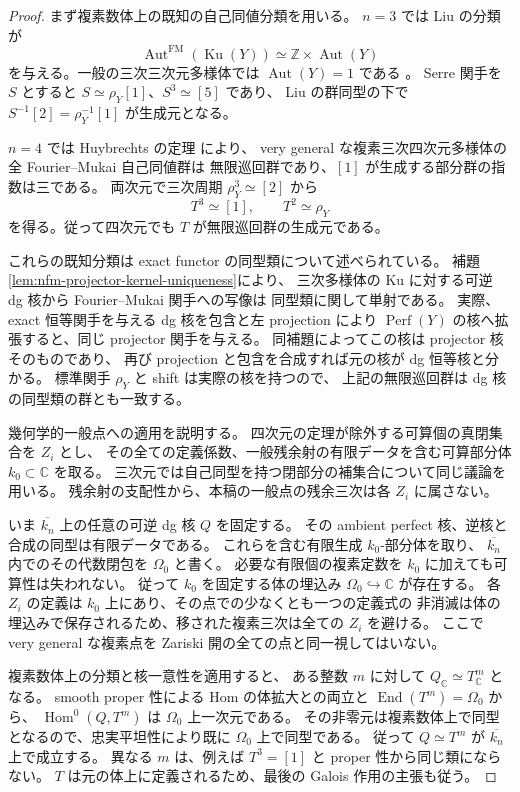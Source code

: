 \begin{proof}
まず複素数体上の既知の自己同値分類を用いる。
$n=3$ では Liu の分類
\cite[Theorem~4.13]{NFMLiuCubicThreefoldAut}が
\[
 \operatorname{Aut}^{\mathrm{FM}}(\operatorname{Ku}(Y))
       \simeq\mathbb Z\times\operatorname{Aut}(Y)
\]
を与える。一般の三次三次元多様体では $\operatorname{Aut}(Y)=1$ である
\cite[Theorems~1.1, 1.5 and the paragraph preceding Theorem~1.5]
 {NFMPoonenAutomorphisms}。
Serre 関手を $S$ とすると $S\simeq\rho_Y[1]$、$S^3\simeq[5]$ であり、
Liu の群同型の下で $S^{-1}[2]=\rho_Y^{-1}[1]$ が生成元となる。

$n=4$ では Huybrechts の定理
\cite[Theorem~1.2(i)]{NFMHuybrechtsK3Cubic}により、
very general な複素三次四次元多様体の全 Fourier--Mukai 自己同値群は
無限巡回群であり、$[1]$ が生成する部分群の指数は三である。
両次元で三次周期 $\rho_Y^3\simeq[2]$ から
\[
 T^3\simeq[1],\qquad T^2\simeq\rho_Y
\]
を得る。従って四次元でも $T$ が無限巡回群の生成元である。

これらの既知分類は exact functor の同型類について述べられている。
補題\ref{lem:nfm-projector-kernel-uniqueness}により、
三次多様体の Ku に対する可逆 dg 核から Fourier--Mukai 関手への写像は
同型類に関して単射である。
実際、exact 恒等関手を与える dg 核を包含と左 projection により
$\operatorname{Perf}(Y)$ の核へ拡張すると、同じ projector 関手を与える。
同補題によってこの核は projector 核そのものであり、
再び projection と包含を合成すれば元の核が dg 恒等核と分かる。
標準関手 $\rho_Y$ と shift は実際の核を持つので、
上記の無限巡回群は dg 核の同型類の群とも一致する。

幾何学的一般点への適用を説明する。
四次元の定理が除外する可算個の真閉集合を $Z_i$ とし、
その全ての定義係数、一般残余射の有限データを含む可算部分体
$k_0\subset\mathbb C$ を取る。
三次元では自己同型を持つ閉部分の補集合について同じ議論を用いる。
残余射の支配性から、本稿の一般点の残余三次は各 $Z_i$ に属さない。

いま $\overline{k_n}$ 上の任意の可逆 dg 核 $Q$ を固定する。
その ambient perfect 核、逆核と合成の同型は有限データである。
これらを含む有限生成 $k_0$-部分体を取り、
$\overline{k_n}$ 内でのその代数閉包を $\Omega_0$ と書く。
必要な有限個の複素定数を $k_0$ に加えても可算性は失われない。
従って $k_0$ を固定する体の埋込み $\Omega_0\hookrightarrow\mathbb C$ が存在する。
各 $Z_i$ の定義は $k_0$ 上にあり、その点での少なくとも一つの定義式の
非消滅は体の埋込みで保存されるため、移された複素三次は全ての $Z_i$ を避ける。
ここで very general な複素点を Zariski 開の全ての点と同一視してはいない。

複素数体上の分類と核一意性を適用すると、
ある整数 $m$ に対して $Q_{\mathbb C}\simeq T^m_{\mathbb C}$ となる。
smooth proper 性による Hom の体拡大との両立と
$\operatorname{End}(T^m)=\Omega_0$ から、
$\operatorname{Hom}^0(Q,T^m)$ は $\Omega_0$ 上一次元である。
その非零元は複素数体上で同型となるので、忠実平坦性により既に $\Omega_0$ 上で同型である。
従って $Q\simeq T^m$ が $\overline{k_n}$ 上で成立する。
異なる $m$ は、例えば $T^3=[1]$ と proper 性から同じ類にならない。
$T$ は元の体上に定義されるため、最後の Galois 作用の主張も従う。
\end{proof}

